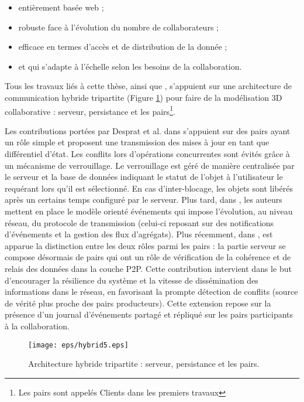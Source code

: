 \begin{itemize}
	\item entièrement basée web ; 
	\item robuste face à l'évolution du nombre de collaborateurs ; 
	\item efficace en termes d'accès et de distribution de la donnée ; 
	\item et qui s'adapte à l'échelle selon les besoins de la collaboration.
\end{itemize}


Tous les travaux liés à cette thèse, 
\cite{Desprat2015a,Desprat2015b} ainsi que \cite{Desprat2016,Desprat2017}, 
s'appuient sur une 
architecture de communication hybride tripartite (Figure \ref{fig:hybrid}) pour 
faire de la modélisation \gls{3D} collaborative : serveur, persistance 
et les pairs\footnote{Les pairs sont appelés \og Clients\fg{} dans les premiers 
travaux}. 

Les contributions portées par Desprat et al. dans 
\cite{Desprat2015a,Desprat2015b} 
s'appuient sur des pairs ayant un rôle simple et proposent une transmission des 
mises à jour en tant que différentiel d'état. Les conflits lors d'opérations 
concurrentes sont évités grâce à un mécanisme de verrouillage. Le verrouillage 
est géré de manière centralisée par le serveur et la base de données indiquant le 
statut de l'objet à l'utilisateur le requérant lors qu'il est sélectionné. En cas 
d'inter-blocage, les objets sont libérés après un certains temps configuré par le 
serveur.
Plus tard, dans \cite{Desprat2016}, les auteurs mettent en place le modèle 
orienté événements qui impose l'évolution, au niveau réseau, du protocole 
de transmission (celui-ci reposant sur 
des notifications d'événements et la gestion des flux d'agrégats). 
Plus récemment, dans \cite{Desprat2017}, est apparue la distinction entre 
les deux rôles parmi les pairs : la 
partie serveur se compose désormais de pairs qui ont un rôle de vérification 
de la cohérence et de relais des données dans la couche \gls{P2P}. Cette 
contribution intervient dans le but d'encourager la résilience du système et la 
vitesse de dissémination des informations dans le réseau, en favorisant la prompte 
détection de conflits (source de vérité plus proche des pairs producteurs). 
Cette extension repose sur la présence d'un journal d'événements partagé et 
répliqué sur les pairs participants à la collaboration.

\begin{figure}[h!]
	\centering
	\texttt{[image: eps/hybrid5.eps]}
	\caption{Architecture hybride tripartite : serveur, persistance 
		et les pairs.}
	\label{fig:hybrid}
\end{figure}

